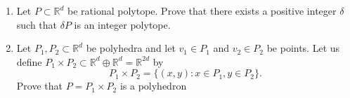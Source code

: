 \documentclass[11pt,a4paper]{article}
\begin{document}
\begin{enumerate}
  
  \item Let $P ⊂ \mathbb{R}^d$ be rational polytope. Prove that there exists a positive integer $δ$ such that $δP$ is an integer polytope.

  \item Let $P_1,P_2 ⊂ \mathbb{R}^d$ be polyhedra and let $v_1 ∈ P_1$ and $v_2 ∈ P_2$ be points. Let us define $P_1 × P_2 ⊂ \mathbb{R}^d ⊕ \mathbb{R}^d = \mathbb{R}^{2d}$ by
$$P_1×P_2= \{(x,y): x∈P_1,y∈P_2\}.$$ 
Prove that $P = P_1 × P_2$ is a polyhedron
      
      

\end{enumerate}


%
%


 
\end{document}
